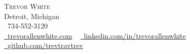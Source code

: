 \documentclass[letterpaper,11pt]{article}
\begin{document}

\begin{center}
    {\Huge \scshape Trevor White} \\ \vspace{2pt}
    Detroit, Michigan \\ \vspace{1pt}
    \small \raisebox{-0.1\height}\faPhone\ {734-552-3120} ~ 
    {\raisebox{-0.2\height}} ~\\ \vspace{0pt}
    \small \href{http://www.TrevorAllenWhite.com}{\raisebox{-0.2\height}\faLink\ \uline{trevorallenwhite.com}} ~
    \href{https://linkedin.com/in/trevorallenwhite/}{\raisebox{-0.2\height}\faLinkedin\ \uline{linkedin.com/in/trevorallenwhite}} ~
    \href{https://github.com/trevtravtrev}{\raisebox{-0.2\height}\faGithub\ \uline{github.com/trevtravtrev}}
    \vspace{-12pt}
\end{center}

\end{document}
